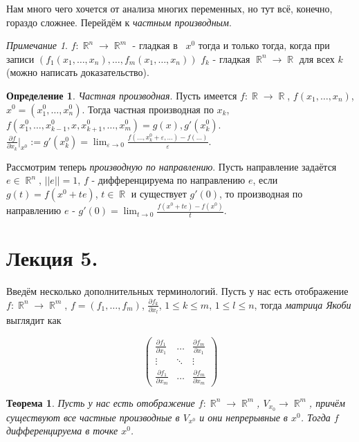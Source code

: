 \documentclass[a4paper,100pt]{article}
\theoremstyle{indented}
\newtheorem{theorem}{Теорема}
\theoremstyle{definition}
\newtheorem{defn}{Определение}
\theoremstyle{remark}
\newtheorem{remark}{Примечание}
\DeclareMathOperator{\RR}{\mathbb{R}}
\begin{document}
Нам много чего хочется от анализа многих переменных, но тут всё, конечно, гораздо сложнее. Перейдём к \textit{частным производным}.

\begin{remark}
    $f:\RR^n\rightarrow \RR^m$ - гладкая в  $x^0$ тогда и только тогда, когда  при записи $(f_1(x_1, \ldots, x_n), \ldots, f_m(x_1, \ldots, x_n))$ $f_k$ - гладкая $\RR^n\rightarrow \RR$ для всех $k$ (можно написать доказательство). 
\end{remark}  

\begin{defn}
    \textit{Частная производная}. Пусть имеется $f:\RR\rightarrow \RR$, $f(x_1, \ldots, x_n)$, $x^0=(x_1^0, \ldots, x_n^0)$. Тогда частная производная по $x_k $, $f(x_1^0, \ldots, x_{k-1}^0, x, x_{k+1}^0, \ldots, x_m^0)=g(x), g'(x_k^0)$. $\frac{\partial f}{\partial x_k}\bigg|_{x^0}:=g'(x_k^0)=\lim_{\varepsilon\rightarrow 0}\frac{f(\ldots, x_k^0+\varepsilon, \ldots)-f(\ldots)}{\varepsilon}$. 
\end{defn}

Рассмотрим теперь \textit{производную по направлению}. Пусть направление задаётся $e\in\RR^n$, $||e||=1$, $f$ - дифференцируема по направлению $e$, если $g(t)=f(x^0+te)$, $t\in\RR$ и существует $g'(0)$, то производная по направлению $e$ - $g'(0)=\lim_{t\rightarrow 0}\frac{f(x^0+te)-f(x^0)}{t}$.  

\section{Лекция 5.}

Введём несколько дополнительных терминологий. Пусть у нас есть отображение $f:\RR^n\rightarrow \RR^m$, $f=(f_1, \ldots, f_m)$, $\frac{\partial f_k}{\partial x_l}$, $1\leq k\leq m$, $1\leq l\leq n$, тогда \textit{матрица Якоби} выглядит как

\begin{equation*}
    \begin{pmatrix}
        \frac{\partial f_1}{\partial x_1} & \dots & \frac{\partial f_m}{\partial x_1} \\
        \vdots & \ddots & \vdots \\
        \frac{\partial f_1}{\partial x_m} & \dots & \frac{\partial f_m}{\partial x_m}
    \end{pmatrix}
\end{equation*}

\begin{theorem}
    Пусть у нас есть отображение $f:\RR^n\rightarrow \RR^m$, $V_{x_0}\rightarrow \RR^m$, причём существуют все частные производные в $V_{x^0}$ и они непрерывные в $x^0$. Тогда $f$ дифференцируема в точке $x^0$. 
\end{theorem}
\end{document}
